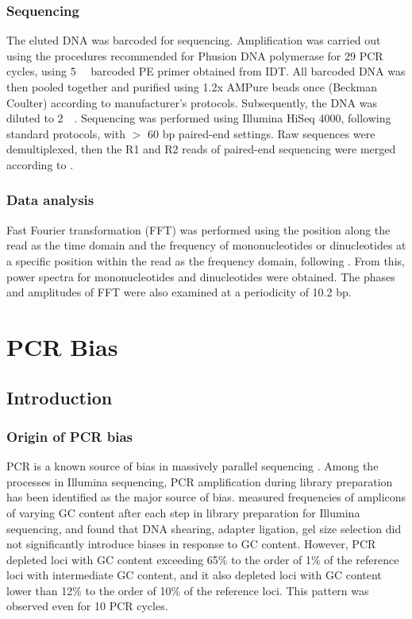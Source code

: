 \documentclass[parskip=full, numbers=noenddot]{scrbook}
\begin{document}
\subsection{Sequencing}
\label{ssec:emsaselex_methods_seq}

The eluted DNA was barcoded for sequencing.  Amplification was carried out using the procedures recommended for Phusion DNA polymerase for 29 PCR cycles, using \SI{5}{\micro\Molar} barcoded PE primer obtained from IDT.  All barcoded DNA was then pooled together and purified using 1.2x AMPure beads once (Beckman Coulter) according to manufacturer's protocols.  Subsequently, the DNA was diluted to \SI{2}{\nano\Molar}.  Sequencing was performed using Illumina HiSeq 4000, following standard protocols, with $>$ 60 bp paired-end settings.  Raw sequences were demultiplexed, then the R1 and R2 reads of paired-end sequencing were merged according to \citet{zhu_interaction_2018}.

\subsection{Data analysis}
\label{ssec:emsaselex_methods_anal}

Fast Fourier transformation (FFT) was performed using the position along the read as the time domain and the frequency of mononucleotides or dinucleotides at a specific position within the read as the frequency domain, following \citet{zhu_interaction_2018}.  From this, power spectra for mononucleotides and dinucleotides were obtained.  The phases and amplitudes of FFT were also examined at a periodicity of 10.2 bp.

\chapter{PCR Bias}
\label{ch:pcrbias}

\section{Introduction}
\label{sec:pcrbias_intro}

\subsection{Origin of PCR bias}
\label{ssec:pcrbias_intro_origin}

PCR is a known source of bias in massively parallel sequencing \citep{olova_comparison_2018}.  Among the processes in Illumina sequencing, PCR amplification during library preparation has been identified as the major source of bias.  \citet{aird_analyzing_2011} measured frequencies of amplicons of varying GC content after each step in library preparation for Illumina sequencing, and found that DNA shearing, adapter ligation, gel size selection did not significantly introduce biases in response to GC content.  However, PCR depleted loci with GC content exceeding 65\% to the order of 1\% of the reference loci with intermediate GC content, and it also depleted loci with GC content lower than 12\% to the order of 10\% of the reference loci.  This pattern was observed even for 10 PCR cycles.
\end{document}
